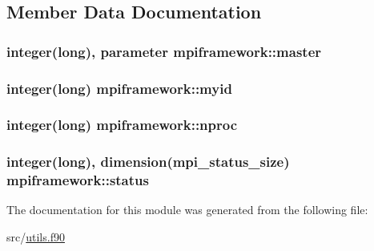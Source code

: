\subsection{Member Data Documentation}
\hypertarget{classmpiframework_ae3cf75bc4150b05cabe037cf7478d4a0}{
\subsubsection[{master}]{\setlength{\rightskip}{0pt plus 5cm}integer(long), parameter mpiframework\+::master}}\label{classmpiframework_ae3cf75bc4150b05cabe037cf7478d4a0}
\hypertarget{classmpiframework_ae833a6cbdc45698ffa99a650f0e6bb2d}{
\subsubsection[{myid}]{\setlength{\rightskip}{0pt plus 5cm}integer(long) mpiframework\+::myid}}\label{classmpiframework_ae833a6cbdc45698ffa99a650f0e6bb2d}
\hypertarget{classmpiframework_af70b38210cb3bcccdc873618ffb3de35}{
\subsubsection[{nproc}]{\setlength{\rightskip}{0pt plus 5cm}integer(long) mpiframework\+::nproc}}\label{classmpiframework_af70b38210cb3bcccdc873618ffb3de35}
\hypertarget{classmpiframework_ab7c6b211b6d67a29e8b7e2cefe97d5b2}{
\subsubsection[{status}]{\setlength{\rightskip}{0pt plus 5cm}integer(long), dimension(mpi\+\_\+status\+\_\+size) mpiframework\+::status}}\label{classmpiframework_ab7c6b211b6d67a29e8b7e2cefe97d5b2}


The documentation for this module was generated from the following file\+:\begin{DoxyCompactItemize}
\item 
src/\hyperlink{utils_8f90}{utils.\+f90}\end{DoxyCompactItemize}
